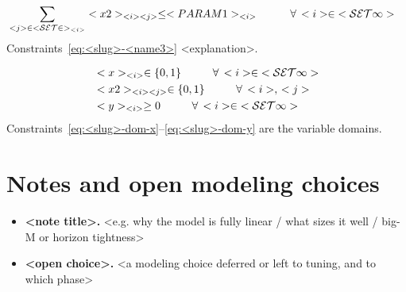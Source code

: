 \begin{align}
  & \sum_{<j> \in \mathcal{<SET2>}_{<i>}} <x2>_{<i><j>} \le <PARAM1>_{<i>}
    \hspace{10mm} \forall\, <i> \in \mathcal{<SET1>}
    \label{eq:<slug>-<name3>}
\end{align}
Constraints~\eqref{eq:<slug>-<name3>} <explanation>.


\begin{align}
  & <x>_{<i>}     \in \{0,1\}            \hspace{10mm} \forall\, <i> \in \mathcal{<SET1>} \label{eq:<slug>-dom-x} \\
  & <x2>_{<i><j>} \in \{0,1\}            \hspace{10mm} \forall\, <i>,\, <j> \label{eq:<slug>-dom-x2} \\
  & <y>_{<i>}     \ge 0                  \hspace{10mm} \forall\, <i> \in \mathcal{<SET1>} \label{eq:<slug>-dom-y}
\end{align}
Constraints~\eqref{eq:<slug>-dom-x}--\eqref{eq:<slug>-dom-y} are the variable
domains.

\section{Notes and open modeling choices}\label{sec:<slug>-notes}
\begin{itemize}
  \item \textbf{<note title>.} <e.g. why the model is fully linear / what sizes it well / big-M or horizon tightness>
  \item \textbf{<open choice>.} <a modeling choice deferred or left to tuning, and to which phase>
\end{itemize}

